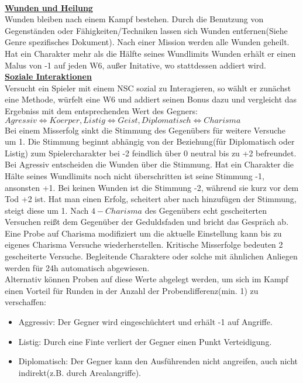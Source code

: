 \documentclass[twoside,a4paper]{minimal}
\begin{document}
\begin{multicols*}{3}
\textbf{\uline{\\Wunden und Heilung}}
\\Wunden bleiben nach einem Kampf bestehen. Durch die Benutzung von Gegenständen oder Fähigkeiten/Techniken lassen sich Wunden entfernen(Siehe Genre spezifisches Dokument). Nach einer Mission werden alle Wunden geheilt. Hat ein Charakter mehr als die Hälfte seines Wundlimits Wunden erhält er einen Malus von -1 auf jeden W6, außer Initative, wo stattdessen addiert wird.
\textbf{\uline{\\Soziale Interaktionen}}
\\Versucht ein Spieler mit einem NSC sozial zu Interagieren, so wählt er zunächst eine Methode, würfelt eine W6 und addiert seinen Bonus dazu und vergleicht das Ergebniss mit dem entsprechenden Wert des Gegners:
\\$Agressiv\iff Koerper,Listig\iff Geist,Diplomatisch\iff Charisma$
\\Bei einem Misserfolg sinkt die Stimmung des Gegenübers für weitere Versuche um 1. Die Stimmung beginnt abhängig von der Beziehung(für Diplomatisch oder Listig) zum Spielercharakter bei -2 feindlich über 0 neutral bis zu +2 befreundet. Bei Agressiv entscheiden die Wunden über die Stimmung. Hat ein Charakter die Hälte seines Wundlimits noch nicht überschritten ist seine Stimmung -1, ansonsten +1. Bei keinen Wunden ist die Stimmung -2, während sie kurz vor dem Tod +2 ist. Hat man einen Erfolg, scheitert aber nach hinzufügen der Stimmung, steigt diese um 1. Nach $4-Charisma$ des Gegenübers echt gescheiterten Versuchen reißt dem Gegenüber der Geduldsfaden und bricht das Gespräch ab. Eine Probe auf Charisma modifiziert um die aktuelle Einstellung kann bis zu eigenes Charisma Versuche wiederherstellen. Kritische Misserfolge bedeuten 2 gescheiterte Versuche. Begleitende Charaktere oder solche mit ähnlichen Anliegen werden für 24h automatisch abgewiesen.
\\Alternativ können Proben auf diese Werte abgelegt werden, um sich im Kampf einen Vorteil für Runden in der Anzahl der Probendifferenz(min. 1) zu verschaffen:
\begin{itemize}
\item Aggressiv: Der Gegner wird eingeschüchtert und erhält -1 auf Angriffe.
\item Listig: Durch eine Finte verliert der Gegner einen Punkt Verteidigung.
\item Diplomatisch: Der Gegner kann den Ausführenden nicht angreifen, auch nicht indirekt(z.B. durch Arealangriffe).
\end{itemize}

\end{multicols*}
\end{document}
